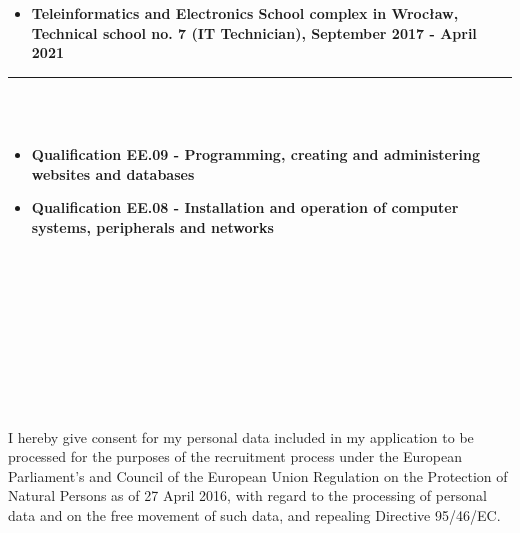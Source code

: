 \documentclass[10pt]{article}
\begin{document}
\begin{minipage}[t]{0.60\textwidth}
\begin{itemize}[leftmargin=*]
            \item \textbf{Teleinformatics and Electronics School complex in Wrocław, \\ Technical school no. 7 (IT Technician), September 2017 - April 2021} 
        \end{itemize}
        \rule{11cm}{1pt} \\ \\
        \fontsize{10pt}{10pt}
        \begin{itemize}[leftmargin=*]
            \setlength{\parskip}{0pt}
            \item \textbf{Qualification EE.09 - Programming, creating and administering \\ websites and databases}
            \item \textbf{Qualification EE.08 - Installation and operation of computer systems, peripherals and networks}
        \end{itemize}
        \rule{0pt}{0pt} \\ \\ \\ \\ \\ \\ \\ \\ \\
        \fontsize{7pt}{5pt}\selectfont  
        I hereby give consent for my personal data included in my application to be processed for 
        the purposes of the recruitment process under the European Parliament's and Council of the 
        European Union Regulation on the Protection of Natural Persons as of 27 April 2016, with 
        regard to the processing of personal data and on the free movement of such data, and repealing 
        Directive 95/46/EC.
    \end{minipage}
\end{document}
